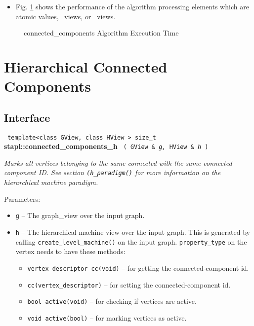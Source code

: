 \begin{itemize}
\item
Fig. \ref{fig:conn-comp-alg-exec-exper}
shows the performance of the algorithm processing
elements which are atomic values, \stl\ views, or \stapl\ views.
\end{itemize}

\begin{figure}[p]
\caption{connected\_components Algorithm Execution Time}
\label{fig:conn-comp-alg-exec-exper}
\end{figure}


\section{ Hierarchical Connected Components}
\label{sec-conn-comp-hmach-alg}

\subsection{Interface} \label{sec-conn-comp-hmach-alg-inter}

\noindent
\texttt{%
template<class GView, class HView >
\newline
size\_t 
}
\newline
\textbf{stapl::connected\_components\_h}%
\newline
\texttt{%
(
GView \&
\textit{g,}%
HView \&
\textit{h}%
)     
}
\vspace{0.4cm}

\textit{
Marks all vertices belonging to the same connected with the same connected-component ID.
See  section
\texttt{(h\_paradigm()}%
for more information on the hierarchical machine paradigm.
}
\vspace{0.4cm}

Parameters:
\begin{itemize}
\item
\texttt{g} --
The graph\_view over the input graph.
\item
\texttt{h} --
The hierarchical machine view over the input graph. This is generated by calling
\texttt{create\_level\_machine()}%
on the input graph. 
\texttt{property\_type}%
on the vertex needs to have these methods: 
\begin{itemize}
\item
\texttt{vertex\_descriptor cc(void)} --
for getting the connected-component id. 
\item
\texttt{cc(vertex\_descriptor)} --
for setting the connected-component id. 
\item
\texttt{bool active(void)} --
for checking if vertices are active. 
\item
\texttt{void active(bool)} --
for marking vertices as active.
\end{itemize}
\end{itemize}

